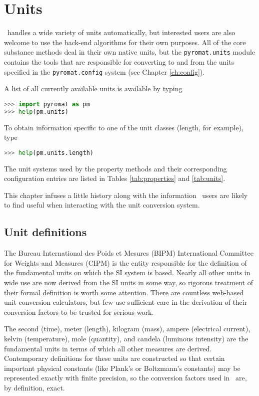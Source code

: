 \chapter{Units}\label{ch:units}

\PM\ handles a wide variety of units automatically, but interested users are also welcome to use the back-end algorithms for their own purposes.  All of the core substance methods deal in their own native units, but the \verb|pyromat.units| module contains the tools that are responsible for converting to and from the units specified in the \verb|pyromat.config| system (see Chapter \ref{ch:config}).

A list of all currently available units is available by typing
\begin{lstlisting}[language=Python]
>>> import pyromat as pm
>>> help(pm.units)
\end{lstlisting}
To obtain information specific to one of the unit classes (length, for example), type
\begin{lstlisting}[language=Python]
>>> help(pm.units.length)
\end{lstlisting}

The unit systems used by the property methods and their corresponding configuration entries are listed in Tables \ref{tab:properties} and \ref{tab:units}.  

This chapter infuses a little history along with the information \PM\ users are likely to find useful when interacting with the unit conversion system.

\section{Unit definitions}\label{sec:units:def}

The Bureau International des Poids et Mesures (BIPM) International Committee for Weights and Measures (CIPM) is the entity responsible for the definition of the fundamental units on which the SI system is based.  Nearly all other units in wide use are now derived from the SI units in some way, so rigorous treatment of their formal definition is worth some attention.  There are countless web-based unit conversion calculators, but few use sufficient care in the derivation of their conversion factors to be trusted for serious work.

The second (time), meter (length), kilogram (mass), ampere (electrical current), kelvin (temperature), mole (quantity), and candela (luminous intensity) are the fundamental units in terms of which all other measures are derived.  Contemporary definitions for these units are constructed so that certain important physical constants (like Plank's or Boltzmann's constants) may be represented exactly with finite precision, so the conversion factors used in \PM\ are, by definition, exact.

